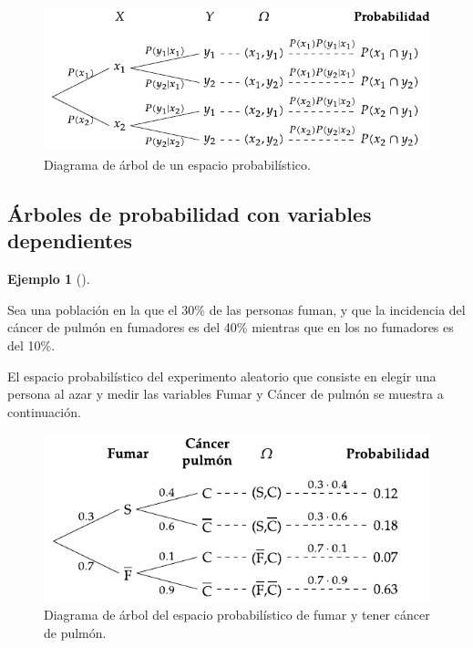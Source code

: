 \documentclass[
  a4paper,
]{scrreport}
\theoremstyle{plain}
\theoremstyle{definition}
\newtheorem{example}{Ejemplo}[chapter]
\theoremstyle{definition}
\theoremstyle{remark}
\begin{document}
\begin{figure}[H]

{\centering \includegraphics{img/probabilidad/espacio_probabilistico.pdf}

}

\caption{Diagrama de árbol de un espacio probabilístico.}

\end{figure}%

\subsection{Árboles de probabilidad con variables
dependientes}\label{uxe1rboles-de-probabilidad-con-variables-dependientes}

\begin{example}[]\protect\hypertarget{exm-arbol-probabilidad-variables-dependientes}{}\label{exm-arbol-probabilidad-variables-dependientes}

Sea una población en la que el 30\% de las personas fuman, y que la
incidencia del cáncer de pulmón en fumadores es del 40\% mientras que en
los no fumadores es del 10\%.

El espacio probabilístico del experimento aleatorio que consiste en
elegir una persona al azar y medir las variables Fumar y Cáncer de
pulmón se muestra a continuación.

\begin{figure}[H]

{\centering \includegraphics{img/probabilidad/espacio_probabilistico_fumar_cancer.pdf}

}

\caption{Diagrama de árbol del espacio probabilístico de fumar y tener
cáncer de pulmón.}

\end{figure}%

\end{example}
\end{document}
